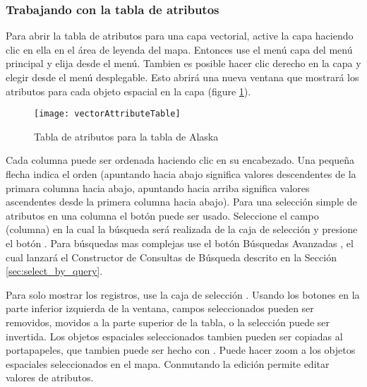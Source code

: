 \subsubsection{Trabajando con la tabla de atributos}\label{sec:attribute table}

Para abrir la tabla de atributos para una capa vectorial, active la capa haciendo clic en ella en el \'area de leyenda del mapa. 
Entonces use el men\'u  capa del men\'u principal y elija  
desde el men\'u. Tambien es posible hacer clic derecho en la capa y elegir  
desde el men\'u desplegable. Esto abrir\'a una nueva ventana que mostrar\'a los atributos para cada objeto espacial en la capa 
(figure \ref{fig:attributetable}).

\begin{figure}[ht]
   \begin{center}
   \caption{Tabla de atributos para la tabla de Alaska \nixcaption}\label{fig:attributetable}\smallskip
   \texttt{[image: vectorAttributeTable]}
\end{center} 
\end{figure}

Cada columna puede ser ordenada haciendo clic en su encabezado. Una peque\~na flecha indica el orden 
(apuntando hacia abajo significa valores descendentes de la primara columna hacia abajo, apuntando hacia arriba significa valores ascendentes desde la primera columna hacia abajo). 
Para una selecci\'on simple de atributos en una columna el bot\'on  
puede ser usado. Seleccione el campo (columna) en la cual la b\'usqueda ser\'a realizada 
de la caja de selecci\'on y presione el bot\'on . Para b\'usquedas mas complejas use
el bot\'on B\'usquedas Avanzadas , el cual lanzar\'a el Constructor de Consultas de B\'usqueda descrito en 
la Secci\'on \ref{sec:select_by_query}. 

Para solo mostrar los registros, use la caja de selecci\'on .
Usando los botones en la parte inferior izquierda  de la ventana, campos seleccionados pueden ser removidos, 
movidos a la parte superior de la tabla, o la selecci\'on puede ser invertida. Los objetos espaciales seleccionados tambien pueden ser
copiadas al portapapeles, que tambien puede ser hecho con . Puede hacer zoom 
a los objetos espaciales seleccionados en el mapa. Conmutando la edici\'on permite editar valores de atributos. 

